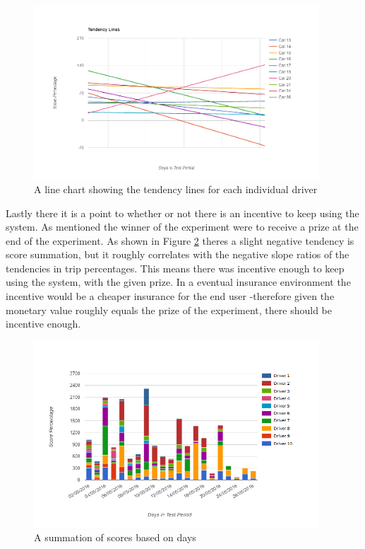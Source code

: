 \begin{figure}[tb]
\centering
\includegraphics[width=0.95\textwidth]{Pictures/tendenslinjer}
\caption{A line chart showing the tendency lines for each individual driver}
\label{fig:tendencylines}
\end{figure}

Lastly there it is a point to whether or not there is an incentive to keep using the system. As mentioned the winner of the experiment were to receive a prize at the end of the experiment. As shown in Figure \ref{fig:summationoftripscore} theres a slight negative tendency is score summation, but it roughly correlates with the negative slope ratios of the tendencies in trip percentages. This means there was incentive enough to keep using the system, with the given prize. In a eventual insurance environment the incentive would be a cheaper insurance for the end user -therefore given the monetary value roughly equals the prize of the experiment, there should be incentive enough.

\begin{figure}[tb]
\centering
\includegraphics[width=0.95\textwidth]{Pictures/summationoftripscore}
\caption{A summation of scores based on days}
\label{fig:summationoftripscore}
\end{figure}
 